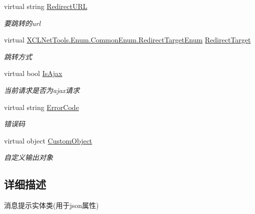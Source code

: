 \begin{DoxyCompactItemize}
virtual string \hyperlink{class_x_c_l_net_tools_1_1_message_1_1_message_model_a571c6e0204605733f900eb3f906e038d}{Redirect\+U\+RL}
\begin{DoxyCompactList}\small\item\em 要跳转的url \end{DoxyCompactList}\item 
virtual \hyperlink{class_x_c_l_net_tools_1_1_enum_1_1_common_enum_a1cd31513e5ecf78c77d76be7954ae2f4}{X\+C\+L\+Net\+Tools.\+Enum.\+Common\+Enum.\+Redirect\+Target\+Enum} \hyperlink{class_x_c_l_net_tools_1_1_message_1_1_message_model_a318553f7c9db2b2c685e4944feb2901e}{Redirect\+Target}
\begin{DoxyCompactList}\small\item\em 跳转方式 \end{DoxyCompactList}\item 
virtual bool \hyperlink{class_x_c_l_net_tools_1_1_message_1_1_message_model_a1ea24cc20f05516f6266af92cc06479a}{Is\+Ajax}
\begin{DoxyCompactList}\small\item\em 当前请求是否为ajax请求 \end{DoxyCompactList}\item 
virtual string \hyperlink{class_x_c_l_net_tools_1_1_message_1_1_message_model_ab169d7bab20868e935d775459b72e625}{Error\+Code}
\begin{DoxyCompactList}\small\item\em 错误码 \end{DoxyCompactList}\item 
virtual object \hyperlink{class_x_c_l_net_tools_1_1_message_1_1_message_model_a8065226d89965a09b9ff8e69ba9974ca}{Custom\+Object}
\begin{DoxyCompactList}\small\item\em 自定义输出对象 \end{DoxyCompactList}\end{DoxyCompactItemize}


\subsection{详细描述}
消息提示实体类(用于json属性) 



